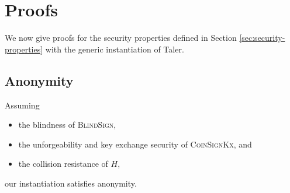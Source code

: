 \section{Proofs}

We now give proofs for the security properties defined in Section \ref{sec:security-properties}
with the generic instantiation of Taler.

\subsection{Anonymity}

\begin{theorem}
  Assuming
  \begin{itemize}
    \item the blindness of \textsc{BlindSign},
    \item the unforgeability and key exchange security of \textsc{CoinSignKx}, and
    \item the collision resistance of $H$,
  \end{itemize}
  our instantiation satisfies anonymity.
\end{theorem}

